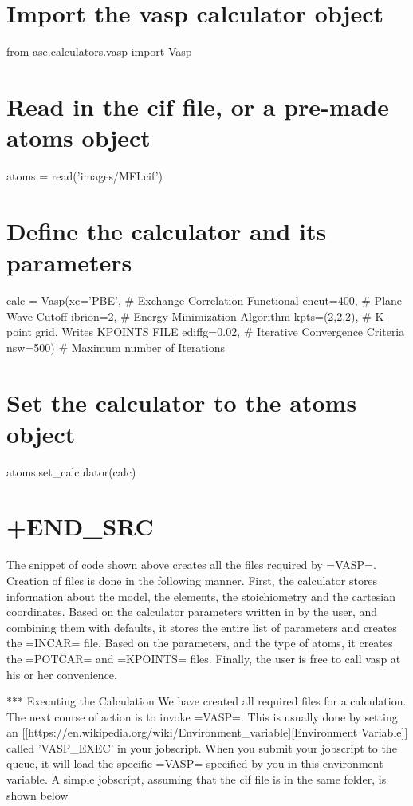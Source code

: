 \documentclass[11pt]{article}
\begin{document}
\section{Import the vasp calculator
object}\label{import-the-vasp-calculator-object}

from ase.calculators.vasp import Vasp

\section{Read in the cif file, or a pre-made atoms
object}\label{read-in-the-cif-file-or-a-pre-made-atoms-object}

atoms = read('images/MFI.cif')

\section{Define the calculator and its
parameters}\label{define-the-calculator-and-its-parameters}

calc = Vasp(xc='PBE', \# Exchange Correlation Functional encut=400, \#
Plane Wave Cutoff ibrion=2, \# Energy Minimization Algorithm
kpts=(2,2,2), \# K-point grid. Writes KPOINTS FILE ediffg=0.02, \#
Iterative Convergence Criteria nsw=500) \# Maximum number of Iterations

\section{Set the calculator to the atoms
object}\label{set-the-calculator-to-the-atoms-object}

atoms.set\_calculator(calc)

\section{+END\_SRC}\label{end_src-1}

The snippet of code shown above creates all the files required by
=VASP=. Creation of files is done in the following manner. First, the
calculator stores information about the model, the elements, the
stoichiometry and the cartesian coordinates. Based on the calculator
parameters written in by the user, and combining them with defaults, it
stores the entire list of parameters and creates the =INCAR= file. Based
on the parameters, and the type of atoms, it creates the =POTCAR= and
=KPOINTS= files. Finally, the user is free to call vasp at his or her
convenience.

*** Executing the Calculation We have created all required files for a
calculation. The next course of action is to invoke =VASP=. This is
usually done by setting an
{[}{[}https://en.wikipedia.org/wiki/Environment\_variable{]}{[}Environment
Variable{]}{]} called 'VASP\_EXEC' in your jobscript. When you submit
your jobscript to the queue, it will load the specific =VASP= specified
by you in this environment variable. A simple jobscript, assuming that
the cif file is in the same folder, is shown below
\end{document}
